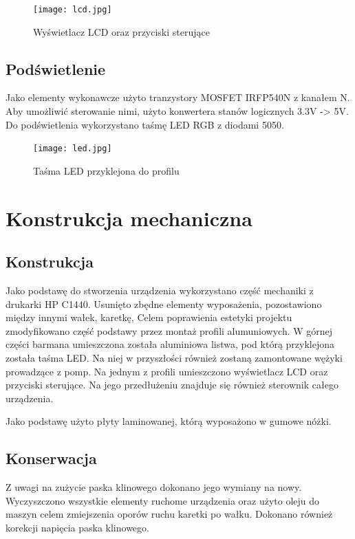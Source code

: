 \documentclass[10pt, a4paper]{article}
\begin{document}
\begin{figure}[H]
	\centering
	\texttt{[image: lcd.jpg]}
	\caption{Wyświetlacz LCD oraz przyciski sterujące}
	\label{fig:LCD}
\end{figure}



\subsection{Podświetlenie}
Jako elementy wykonawcze użyto tranzystory MOSFET IRFP540N z kanałem N. Aby umożliwić sterowanie nimi, użyto konwertera stanów logicznych 3.3V -> 5V. Do podświetlenia wykorzystano taśmę LED RGB z diodami 5050.

\begin{figure}[H]
	\centering
	\texttt{[image: led.jpg]}
	\caption{Taśma LED przyklejona do profilu}
	\label{fig:LED}
\end{figure}




\section{Konstrukcja mechaniczna}

\subsection{Konstrukcja}
Jako podstawę do stworzenia urządzenia wykorzystano część mechaniki z drukarki HP C1440. Usunięto zbędne elementy wyposażenia, pozostawiono między innymi wałek, karetkę, Celem poprawienia estetyki projektu zmodyfikowano część podstawy przez montaż profili alumuniowych. W górnej części barmana umieszczona została aluminiowa listwa, pod którą przyklejona została taśma LED. Na niej w przyszłości również zostaną zamontowane wężyki prowadzące z pomp. 
Na jednym z profili umieszczono wyświetlacz LCD oraz przyciski sterujące. Na jego przedłużeniu znajduje się również sterownik całego urządzenia.

Jako podstawę użyto płyty laminowanej, którą wyposażono w gumowe nóżki. 

\subsection{Konserwacja}
Z uwagi na zużycie paska klinowego dokonano jego wymiany na nowy. Wyczyszczono wszystkie elementy ruchome urządzenia oraz użyto oleju do maszyn celem zmiejszenia oporów ruchu karetki po wałku. Dokonano również korekcji napięcia paska klinowego. 
\end{document}

